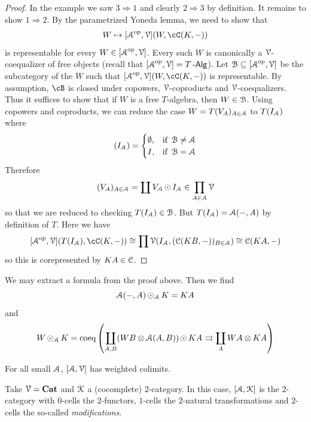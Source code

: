 \documentclass[a4paper,11pt,oneside,openany]{scrbook}
\begin{document}
\begin{proof}
	In the example we saw $3\Rightarrow1$ and clearly $2\Rightarrow3$ by
    definition. It remains to show $1\Rightarrow2$. By the parametrized Yoneda
    lemma, we need to show that
	$$W\mapsto[\A^{\op},\V](W,\cC(K,-))$$
	is representable for every $W\in[\A^{\op},\V]$. Every such $W$ is
    canonically a $\V$-coequalizer of free objects (recall that
    $[\A^{\op},\V]=T\Alg$). Let $\B\subseteq[\A^{\op},\V]$ be the subcategory of
    the $W$ such that $[\A^{\op},\V](W,\cC(K,-))$ is representable. By
    assumption, $\cB$ is closed under copowers, $\V$-coproducts and
    $\V$-coequalizers. Thus it suffices to show that if $W$ is a free
    $T$-algebra, then $W\in\B$. Using copowers and coproducts, we can reduce the
    case $W=T(V_A)_{A\in\A}$ to $T(I_{\A})$ where
	$$(I_{\A})=\begin{cases} \emptyset, & \mbox{if } \B\ne\A \\ I, & \mbox{if } \B=\A
		\end{cases}$$
	Therefore $$(V_A)_{A\in\A}=\coprod{V_{\A}\copw I_{\A}}\in\prod_{A\in\A}\V$$
	so that we are reduced to checking $T(I_{\A})\in\B$. But $T(I_{\A})=\A(-,A)$ by definition of $T$. Here we have
	$$[\A^{\op},\V](T(I_{\A}),\cC(K,-))\cong\prod\V(I_{\A},(\C(KB,-))_{B\in\A})\cong\C(KA,-)$$
	so this is corepresented by $KA\in\C$.
\end{proof}
\begin{rmk}
	We may extract a formula from the proof above. Then we find $$\A(-,A)\copw_{\A}K=KA$$ and $$W\copw_{\A}K=\text{coeq}\left(\coprod_{A,B}(WB\otimes\A(A,B))\copw KA\rightrightarrows\coprod_{A}WA\otimes KA \right)$$
\end{rmk}
\begin{cor}
	For all small $\A$, $[\A,\V]$ has weighted colimits.
\end{cor}
\begin{exmp}
	Take $\V=\Cat$ and $\K$ a (cocomplete) $2$-category. In this case, $[\A,\K]$ is the $2$-category with $0$-cells the $2$-functors, $1$-cells the $2$-natural transformations and $2$-cells the so-called \emph{modifications}.
\end{exmp}
\end{document}

